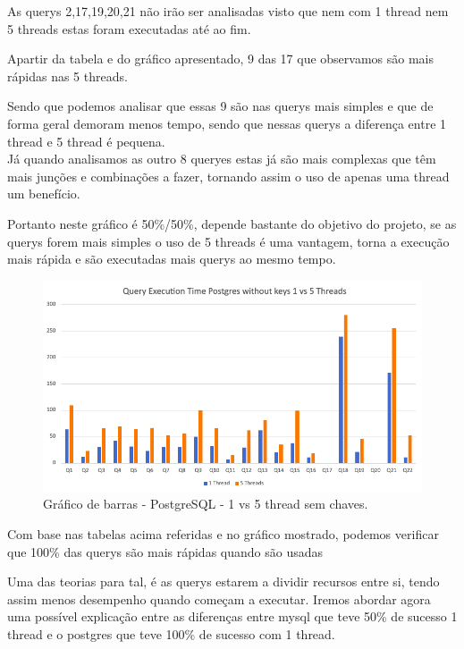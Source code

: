 \documentclass{article}
\begin{document}
  As querys 2,17,19,20,21 não irão ser analisadas visto que nem com 1 thread nem 5 threads estas foram executadas até ao fim.

  Apartir da tabela e do gráfico apresentado, 9 das 17 que observamos são mais rápidas nas 5 threads.

  Sendo que podemos analisar que essas 9 são nas querys mais simples e que de forma geral demoram menos tempo, sendo que nessas querys a diferença entre 1 thread e 5 thread é pequena. \\

  Já quando analisamos as outro 8 queryes estas já são mais complexas que têm mais junções e combinações a fazer, tornando assim o uso de apenas uma thread um benefício.

  Portanto neste gráfico é 50\%/50\%, depende bastante do objetivo do projeto, se as querys forem mais simples o uso de 5 threads é uma vantagem, torna a execução mais rápida e são executadas mais querys ao mesmo tempo.



  \begin{figure}[H]
    \centering
    \includegraphics[width=\textwidth]{Graphs/postgres_withoutkeys_1vs5.png}
    \caption{Gráfico de barras - PostgreSQL - 1 vs 5 thread sem chaves.} 
    \label{fig:PKCreation2}
  \end{figure}

  Com base nas tabelas acima referidas e no gráfico mostrado, podemos verificar que 100\% das querys são mais rápidas quando são usadas 
  
  Uma das teorias para tal, é as querys estarem a dividir recursos entre si, tendo assim menos desempenho quando começam a executar. Iremos abordar agora uma possível explicação entre as diferenças entre mysql que teve 50\% de sucesso 1 thread e o postgres que teve 100\% de sucesso com 1 thread.
\end{document}
